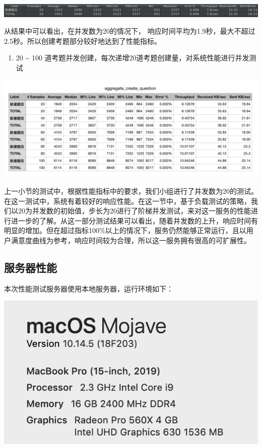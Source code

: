 \documentclass[hyperref, a4paper]{ctexart}
\providecommand{\tightlist}{%
  \setlength{\itemsep}{0pt}\setlength{\parskip}{0pt}}
\begin{document}
\includegraphics{resources/wcn/create_question_20.png}

从结果中可以看出，在并发数为20的情况下，
响应时间平均为1.9秒，最大不超过2.5秒。所以创建考题部分较好地达到了性能指标。

\begin{enumerate}
\def\labelenumi{\arabic{enumi}.}
\setcounter{enumi}{1}
\tightlist
\item
  20 \textasciitilde{} 100
  道考题并发创建，每次递增20道考题创建量，对系统性能进行并发测试
\end{enumerate}

\includegraphics{resources/wcn/create_question_aggregate.png}

上一小节的测试中，根据性能指标中的要求，我们小组进行了并发数为20的测试。在这一测试中，系统有着较好的响应性能。在这一节中，基于负载测试的策略，我们以20为并发数的初始值，步长为20进行了阶梯并发测试，来对这一服务的性能进行进一步的了解。从这一部分测试结果可以看出，随着并发数的上升，响应时间有明显的增加。但在超过指标100\%以上的情况下，服务仍然能够正常运行，且以用户满意度曲线为参考，响应时间较为合理，所以这一服务拥有很高的可扩展性。

\hypertarget{ux670dux52a1ux5668ux6027ux80fd}{%
\subsection{服务器性能}\label{ux670dux52a1ux5668ux6027ux80fd}}

本次性能测试服务器使用本地服务器，运行环境如下：

\includegraphics{resources/wcn/environment.png}
\end{document}
